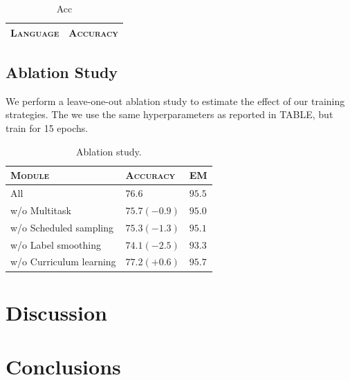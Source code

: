 \documentclass[11pt,a4paper]{article}
\begin{document}
\begin{table}[h]	
\centering
\begin{tabular}{lc}
\textsc{Language} & \textsc{Accuracy} \\
  \hline
  
\end{tabular} 
\caption{Acc}
\label{tab:accuracy}
\end{table}



\subsection{Ablation Study}

We perform a leave-one-out ablation study to estimate the effect of
our training strategies. The we use the same hyperparameters as
reported in TABLE, but train for 15 epochs.



\begin{table}[h]	
\centering
\begin{tabular}{lll}
\textsc{Module} & \textsc{Accuracy} & \textsc{EM} \\
  \hline
  All  & $76.6$ & $95.5$ \\
  w/o Multitask & $75.7 (-0.9)$ & $95.0$ \\
  w/o Scheduled sampling & $75.3 (-1.3)$ & $95.1$ \\
  w/o Label smoothing & $74.1 (-2.5)$ & $93.3$ \\
  w/o Curriculum learning & $77.2 (+0.6)$ & $95.7$ \\
\end{tabular} 
\caption{Ablation study.}
\label{tab:abl}
\end{table}

\section{Discussion}

\section{Conclusions}







\end{document}
